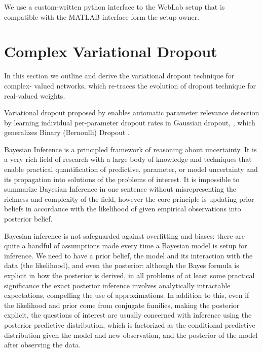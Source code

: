 \documentclass[a4paper,10pt]{article}
\begin{document}
We use a custom-written python interface to the WebLab setup that is compatible with the MATLAB
interface form the setup owner.




\section{Complex Variational Dropout} %
\label{sec:complex_variational_dropout}

In this section we outline and derive the variational dropout technique for complex-%
valued networks, which re-traces the evolution of dropout technique for real-valued
weights.

Variational dropout proposed by \cite{kingma_variational_2015} enables automatic parameter
relevance detection by learning individual per-parameter dropout rates in Gaussian dropout,
\cite{srivastava_dropout_2014,wang_fast_2013}, which generalizes Binary (Bernoulli) Dropout
\cite{hinton_improving_2012}.

Bayesian Inference is a principled framework of reasoning about uncertainty. It is a very
rich field of research with a large body of knowledge and techniques that enable practical
quantification of predictive, parameter, or model uncertainty and its propagation into
solutions of the problems of interest. It is impossible to summarize Bayesian Inference in
one sentence without misrepresenting the richness and complexity of the field, however the
core principle is updating prior beliefs in accordance with the likelihood of given empirical
observations into posterior belief.

Bayesian inference is not safeguarded against overfitting and biases: there are quite a handful
of assumptions made every time a Bayesian model is setup for inference. We need to have a prior
belief, the model and its interaction with the data (the likelihood), and even the posterior:
although the Bayes formula is explicit in how the posterior is derived, in all problems of at
least some practical significance the exact posterior inference involves analytically intractable
expectations, compelling the use of approximations. In addition to this, even if the likelihood
and prior come from conjugate families, making the posterior explicit, the questions of interest
are usually concerned with inference using the posterior predictive distribution, which is
factorized as the conditional predictive distribution given the model and new observation, and
the posterior of the model after observing the data.
\end{document}
